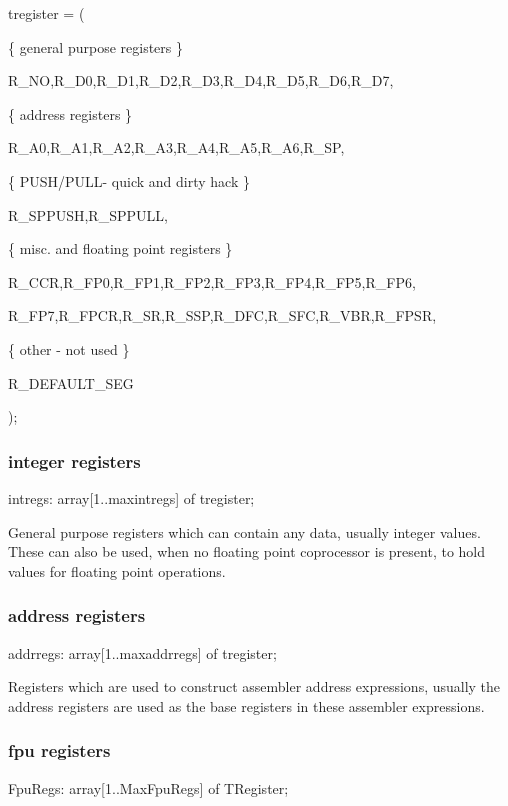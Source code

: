 \documentclass [a4paper,12pt]{article}
\begin{document}
\textsf{tregister = (}

\textsf{{\{} general purpose registers {\}} }

\textsf{R{\_}NO,R{\_}D0,R{\_}D1,R{\_}D2,R{\_}D3,R{\_}D4,R{\_}D5,R{\_}D6,R{\_}D7,}

\textsf{{\{} address registers {\}}}

\textsf{R{\_}A0,R{\_}A1,R{\_}A2,R{\_}A3,R{\_}A4,R{\_}A5,R{\_}A6,R{\_}SP,}

\textsf{{\{} PUSH/PULL- quick and dirty hack {\}}}

\textsf{R{\_}SPPUSH,R{\_}SPPULL,}

\textsf{{\{} misc. and floating point registers {\}}}

\textsf{R{\_}CCR,R{\_}FP0,R{\_}FP1,R{\_}FP2,R{\_}FP3,R{\_}FP4,R{\_}FP5,R{\_}FP6,}

\textsf{R{\_}FP7,R{\_}FPCR,R{\_}SR,R{\_}SSP,R{\_}DFC,R{\_}SFC,R{\_}VBR,R{\_}FPSR,}

\textsf{{\{} other - not used {\}}}

\textsf{R{\_}DEFAULT{\_}SEG}

\textsf{);}

\subsubsection{integer registers}
\label{subsubsec:integer}

\textsf{intregs: array[1..maxintregs] of tregister;}

General purpose registers which can contain any data, usually integer
values. These can also be used, when no floating point coprocessor is
present, to hold values for floating point operations.

\subsubsection{address registers}
\label{subsubsec:address}

\textsf{addrregs: array[1..maxaddrregs] of tregister;}

Registers which are used to construct assembler address expressions, usually
the address registers are used as the base registers in these assembler
expressions.

\subsubsection{fpu registers}
\label{subsubsec:mylabel25}

\textsf{FpuRegs: array[1..MaxFpuRegs] of TRegister;}
\end{document}
